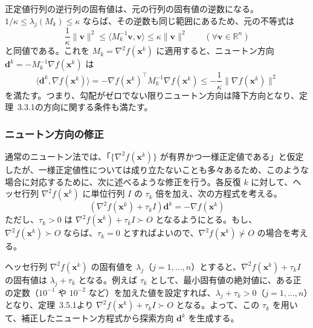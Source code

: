 \documentclass[a4j]{jarticle}
\begin{document}
正定値行列の逆行列の固有値は、元の行列の固有値の逆数になる。$1/\kappa\le\lambda_j(M_k)\le\kappa$ ならば、その逆数も同じ範囲にあるため、元の不等式は
\[
  \frac{1}{\kappa}\|\bm{v}\|^2
  \le\langle M_k^{-1}\bm{v},\bm{v}\rangle
  \le\kappa\|\bm{v}\|^2
  \qquad(\forall\bm{v}\in\mathbb{R}^n)
\]
と同値である。これを $M_k=\nabla^2f(\bm{x}^k)$ に適用すると、ニュートン方向 $\bm{d}^k=-M_k^{-1}\nabla f(\bm{x}^k)$ は
\[
  \langle\bm{d}^k,\nabla f(\bm{x}^k)\rangle
  =-\nabla f(\bm{x}^k)^\top M_k^{-1}\nabla f(\bm{x}^k)
  \le-\frac{1}{\kappa}\|\nabla f(\bm{x}^k)\|^2
\]
を満たす。つまり、勾配がゼロでない限りニュートン方向は降下方向となり、定理~3.3.1の方向に関する条件も満たす。

\subsubsection{ニュートン方向の修正}
通常のニュートン法では、「$\{\nabla^2f(\bm{x}^k)\}$ が有界かつ一様正定値である」と仮定したが、一様正定値性については成り立たないことも多々あるため、このような場合に対応するために、次に述べるような修正を行う。各反復 $k$ に対して、ヘッセ行列 $\nabla^2f(\bm{x}^k)$ に単位行列 $I$ の $\tau_k$ 倍を加え、次の方程式を考える。
\begin{equation}
  \left(\nabla^2f(\bm{x}^k)+\tau_k I\right)\bm{d}^k
  =-\nabla f(\bm{x}^k)
  \label{eq:newton-shift}
\end{equation}
ただし、$\tau_k>0$ は $\nabla^2f(\bm{x}^k)+\tau_k I\succ O$ となるようにとる。もし、$\nabla^2f(\bm{x}^k)\succ O$ ならば、$\tau_k=0$ とすればよいので、$\nabla^2f(\bm{x}^k)\not\succ O$ の場合を考える。

ヘッセ行列 $\nabla^2f(\bm{x}^k)$ の固有値を $\lambda_j$（$j=1,\ldots,n$）とすると、$\nabla^2f(\bm{x}^k)+\tau_k I$ の固有値は $\lambda_j+\tau_k$ となる。例えば $\tau_k$ として、最小固有値の絶対値に、ある正の定数（$10^{-1}$ や $10^{-2}$ など）を加えた値を設定すれば、$\lambda_j+\tau_k>0$（$j=1,\ldots,n$）となり、定理~3.5.1より $\nabla^2f(\bm{x}^k)+\tau_k I\succ O$ となる。よって、この $\tau_k$ を用いて、補正したニュートン方程式から探索方向 $\bm{d}^k$ を生成する。
\end{document}
